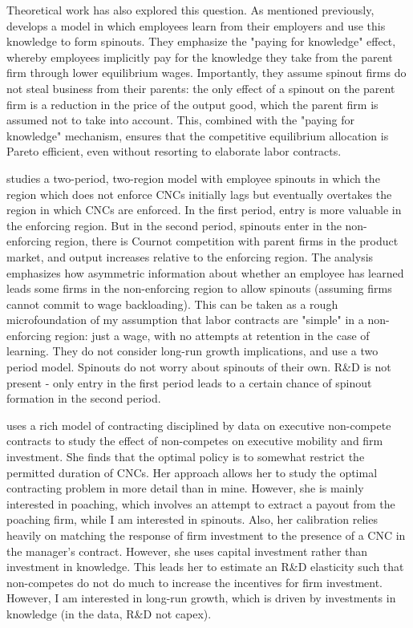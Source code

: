 \documentclass[12pt,english]{article}
\theoremstyle{remark}
\begin{document}
Theoretical work has also explored this question. As mentioned previously, \cite{franco_spin-outs:_2006} develops a model in which employees learn from their employers and use this knowledge to form spinouts. They emphasize the "paying for knowledge" effect, whereby employees implicitly pay for the knowledge they take from the parent firm through lower equilibrium wages. Importantly, they assume spinout firms do not steal business from their parents: the only effect of a spinout on the parent firm is a reduction in the price of the output good, which the parent firm is assumed not to take into account. This, combined with the "paying for knowledge" mechanism, ensures that the competitive equilibrium allocation is Pareto efficient, even without resorting to elaborate labor contracts.

\cite{franco_covenants_2008} studies a two-period, two-region model with employee spinouts in which the region which does not enforce CNCs initially lags but eventually overtakes the region in which CNCs are enforced. In the first period, entry is more valuable in the enforcing region. But in the second period, spinouts enter in the non-enforcing region, there is Cournot competition with parent firms in the product market, and output increases relative to the enforcing region. The analysis emphasizes how asymmetric information about whether an employee has learned leads some firms in the non-enforcing region to allow spinouts (assuming firms cannot commit to wage backloading). This can be taken as a rough microfoundation of my assumption that labor contracts are "simple" in  a non-enforcing region: just a wage, with no attempts at retention in the case of learning. They do not consider long-run growth implications, and use a two period model. Spinouts do not worry about spinouts of their own. R\&D is not present - only entry in the first period leads to a certain chance of spinout formation in the second period. 

\cite{shi_restrictions_2018} uses a rich model of contracting disciplined by data on executive non-compete contracts to study the effect of non-competes on executive mobility and firm investment. She finds that the optimal policy is to somewhat restrict the permitted duration of CNCs. Her approach allows her to study the optimal contracting problem in more detail than in mine. However, she is mainly interested in poaching, which involves an attempt to extract a payout from the poaching firm, while I am interested in spinouts. Also, her calibration relies heavily on matching the response of firm investment to the presence of a CNC in the manager's contract. However, she uses capital investment rather than investment in knowledge. This leads her to estimate an R\&D elasticity such that non-competes do not do much to increase the incentives for firm investment. However, I am interested in long-run growth, which is driven by investments in knowledge (in the data, R\&D not capex).
\end{document}
